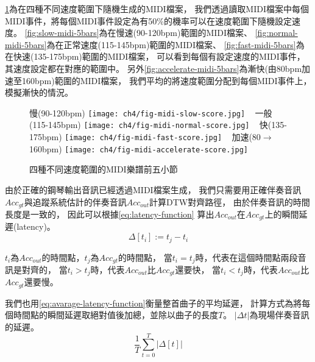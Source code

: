 \documentclass[class=NCU_thesis, crop=false]{standalone}
\begin{document}
\cref{fig:different-speed-midi-score-5bars}為在四種不同速度範圍下隨機生成的MIDI檔案，
我們透過讀取MIDI檔案中每個MIDI事件，將每個MIDI事件設定為有50\%的機率可以在速度範圍下隨機設定速度。
\cref{fig:slow-midi-5bars}為在慢速(90-120bpm)範圍的MIDI檔案、
\cref{fig:normal-midi-5bars}為在正常速度(115-145bpm)範圍的MIDI檔案、
\cref{fig:fast-midi-5bars}為在快速(135-175bpm)範圍的MIDI檔案，
可以看到每個有設定速度的MIDI事件，其速度設定都在對應的範圍中。
另外\cref{fig:accelerate-midi-5bars}為漸快(由80bpm加速至160bpm)範圍的MIDI檔案，
我們平均的將速度範圍分配到每個MIDI事件上，模擬漸快的情況。

\begin{figure}[H]
    \centering
    \subcaptionbox
    {慢(90-120bpm)
    \label{fig:slow-midi-5bars}}
    {\texttt{[image: ch4/fig-midi-slow-score.jpg]}}
    ~
    \subcaptionbox
    {一般(115-145bpm)
    \label{fig:normal-midi-5bars}}
    {\texttt{[image: ch4/fig-midi-normal-score.jpg]}}
    ~
    \subcaptionbox
    {快(135-175bpm)
    \label{fig:fast-midi-5bars}}
    {\texttt{[image: ch4/fig-midi-fast-score.jpg]}}
    ~
    \subcaptionbox
    {加速(80$ \rightarrow $160bpm)
    \label{fig:accelerate-midi-5bars}}
    {\texttt{[image: ch4/fig-midi-accelerate-score.jpg]}}
    \caption{四種不同速度範圍的MIDI樂譜前五小節}
    \label{fig:different-speed-midi-score-5bars}
\end{figure}

由於正確的鋼琴輸出音訊已經透過MIDI檔案生成，
我們只需要用正確伴奏音訊$Acc_{gt}$與追蹤系統估計的伴奏音訊$Acc_{out}$計算DTW對齊路徑，
由於伴奏音訊的時間長度是一致的，
因此可以根據\cref{eq:latency-function}
算出$Acc_{out}$在$Acc_{gt}$上的瞬間延遲(latency)。
\begin{equation}
    \label{eq:latency-function}
    \Delta [t_i] := t_j - t_i
\end{equation}

$t_i$為$Acc_{out}$的時間點，$t_j$為$Acc_{gt}$的時間點，
當$t_i = t_j$時，代表在這個時間點兩段音訊是對齊的，
當$t_i > t_j$時，代表$Acc_{out}$比$Acc_{gt}$還要快，
當$t_i < t_j$時，代表$Acc_{out}$比$Acc_{gt}$還要慢。

我們也用\cref{eq:avarage-latency-function}衡量整首曲子的平均延遲，
計算方式為將每個時間點的瞬間延遲取絕對值後加總，並除以曲子的長度$T$。
$| \Delta t\vert $為現場伴奏音訊的延遲。
\begin{equation}
    \label{eq:avarage-latency-function}
    \frac{1}{T} \sum _{t=0}^{T} | \Delta [t] \vert 
\end{equation}
\end{document}
